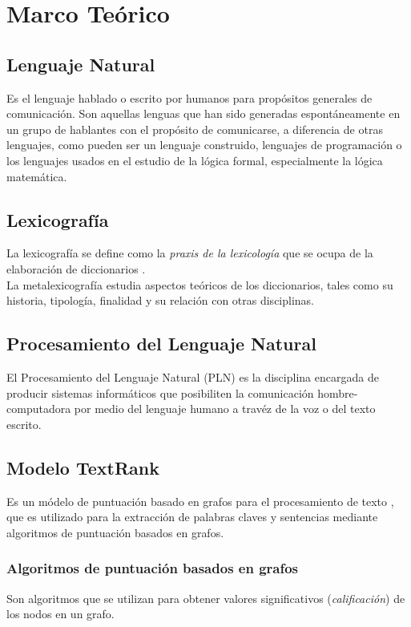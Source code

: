 \chapter{Marco Te\'orico}
\section{Lenguaje Natural}
Es el lenguaje hablado o escrito por humanos para prop\'ositos generales
de comunicaci\'on. Son aquellas lenguas que han sido generadas
espont\'aneamente en un grupo de hablantes con el prop\'osito de
comunicarse, a diferencia de otras lenguajes, como pueden ser un lenguaje
construido, lenguajes de programaci\'on o los lenguajes usados en el
estudio de la l\'ogica formal, especialmente la l\'ogica matem\'atica.

\section{Lexicograf\'ia}
La lexicograf\'ia se define como la \emph{praxis de la lexicolog\'ia} que se ocupa
de la elaboraci\'on de diccionarios \cite{LEX01}. \\

La metalexicograf\'ia estudia aspectos te\'oricos de los diccionarios, tales como
su historia, tipolog\'ia, finalidad y su relaci\'on con otras disciplinas. \\

\section{Procesamiento del Lenguaje Natural}
El Procesamiento del Lenguaje Natural (PLN) es la disciplina encargada
de producir sistemas inform\'aticos que posibiliten la comunicaci\'on
hombre-computadora por medio del lenguaje humano a trav\'ez de la voz o
del texto escrito.

\section{Modelo TextRank}
Es un m\'odelo de puntuaci\'on basado en grafos para el procesamiento de
texto \cite{RMPT04}, que es utilizado para la extracci\'on de palabras claves
y sentencias mediante algoritmos de puntuaci\'on basados en grafos.

\subsection{Algoritmos de puntuaci\'on basados en grafos}
Son algoritmos que se utilizan para obtener valores significativos
(\emph{calificaci\'on}) de los nodos en un grafo. \\

